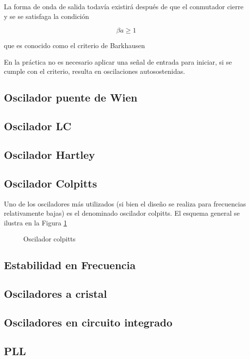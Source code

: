 \documentclass[12pt,letterpaper,titlepage,twoside]{book}
\begin{document}
La forma de onda de salida todavía existirá después de que el conmutador cierre y se se satisfaga la condición 

\begin{equation}
 \beta a \geqslant 1 \label{eq:bark}
 \end{equation} 
 
 que es conocido como el criterio de Barkhausen
 
 En la práctica no es necesario aplicar una señal de entrada para iniciar, si se cumple con el criterio, resulta en oscilaciones autosostenidas.
\subsection{Oscilador puente de Wien}

\subsection{Oscilador LC}

\subsection{Oscilador Hartley}

\subsection{Oscilador Colpitts}
Uno de los osciladores más utilizados (si bien el diseño se realiza para frecuencias relativamente bajas) es el denominado oscilador colpitts. El esquema general se ilustra en la Figura \ref{fig:colpitts}
\begin{figure}

\caption{Oscilador colpitts} \label{fig:colpitts}
\end{figure}

\subsection{Estabilidad en Frecuencia}
\subsection{Osciladores a cristal}
\subsection{Osciladores en circuito integrado}

\subsection{PLL}
\end{document}

